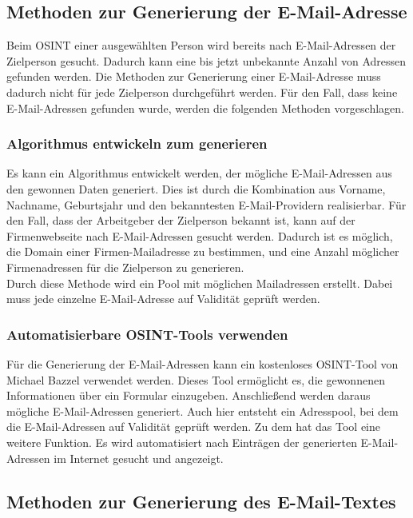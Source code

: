 	\subsection{Methoden zur Generierung der E-Mail-Adresse}
	
	Beim OSINT einer ausgewählten Person wird bereits nach E-Mail-Adressen der Zielperson gesucht. Dadurch kann eine bis jetzt unbekannte Anzahl von Adressen gefunden werden. Die Methoden zur Generierung einer E-Mail-Adresse muss dadurch nicht für jede Zielperson durchgeführt werden. Für den Fall, dass keine E-Mail-Adressen gefunden wurde, werden die folgenden Methoden vorgeschlagen.
	
		\subsubsection{Algorithmus entwickeln zum generieren}
		Es kann ein Algorithmus entwickelt werden, der mögliche E-Mail-Adressen aus den gewonnen Daten generiert. Dies ist durch die Kombination aus Vorname, Nachname, Geburtsjahr und den bekanntesten E-Mail-Providern realisierbar. Für den Fall, dass der Arbeitgeber der Zielperson bekannt ist, kann auf der Firmenwebseite nach E-Mail-Adressen gesucht werden. Dadurch ist es möglich, die Domain einer Firmen-Mailadresse zu bestimmen, und eine Anzahl möglicher Firmenadressen für die Zielperson zu generieren.\\
		Durch diese Methode wird ein Pool mit möglichen Mailadressen erstellt. Dabei muss jede einzelne E-Mail-Adresse auf Validität geprüft werden.

		
		\subsubsection{Automatisierbare OSINT-Tools verwenden}
		Für die Generierung der E-Mail-Adressen kann ein kostenloses OSINT-Tool von Michael Bazzel verwendet werden. Dieses Tool ermöglicht es, die gewonnenen Informationen über ein Formular einzugeben. Anschließend werden daraus mögliche E-Mail-Adressen generiert. Auch hier entsteht ein Adresspool, bei dem die E-Mail-Adressen auf Validität geprüft werden. Zu dem hat das Tool eine weitere Funktion. Es wird automatisiert nach Einträgen der generierten E-Mail-Adressen im Internet gesucht und angezeigt. \cite{EmailAssumptions}
		
	\subsection{Methoden zur Generierung des E-Mail-Textes}
